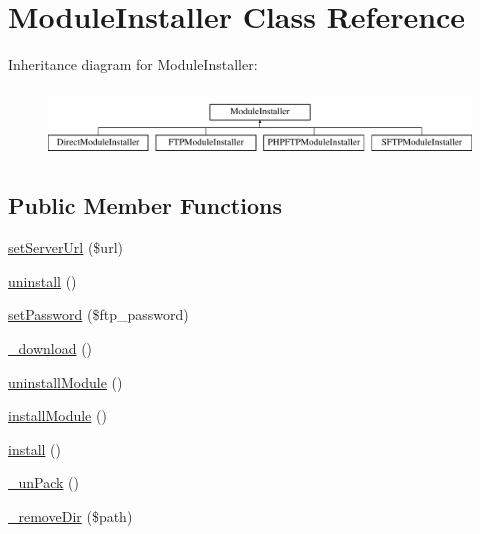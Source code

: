 \hypertarget{classModuleInstaller}{\section{Module\-Installer Class Reference}
\label{classModuleInstaller}
}
Inheritance diagram for Module\-Installer\-:\begin{figure}[H]
\begin{center}
\leavevmode
\includegraphics[height=1.818182cm]{classModuleInstaller}
\end{center}
\end{figure}
\subsection*{Public Member Functions}
\begin{DoxyCompactItemize}
\item 
\hyperlink{classModuleInstaller_a4b4f25bccb1203ee61ff75dd1a0e0964}{set\-Server\-Url} (\$url)
\item 
\hyperlink{classModuleInstaller_a641ebe46305e7c320eec21a13d7e029f}{uninstall} ()
\item 
\hyperlink{classModuleInstaller_ad0cad9e399cc3a7de3f742d43364e96a}{set\-Password} (\$ftp\-\_\-password)
\item 
\hyperlink{classModuleInstaller_aeaa5ff80b85cbf6718f19e755fcbc016}{\-\_\-download} ()
\item 
\hyperlink{classModuleInstaller_a9ab463e12e9685dc42d4223b86a92754}{uninstall\-Module} ()
\item 
\hyperlink{classModuleInstaller_a07eb4b03dfd704124e05142cef5c9e82}{install\-Module} ()
\item 
\hyperlink{classModuleInstaller_aada761e2e31fc610bb69680991813bf8}{install} ()
\item 
\hyperlink{classModuleInstaller_a4b669f44350c27a508c2aac3180836f6}{\-\_\-un\-Pack} ()
\item 
\hyperlink{classModuleInstaller_a1d67a0ab016c393b15df54dabff74e9b}{\-\_\-remove\-Dir} (\$path)
\end{DoxyCompactItemize}
